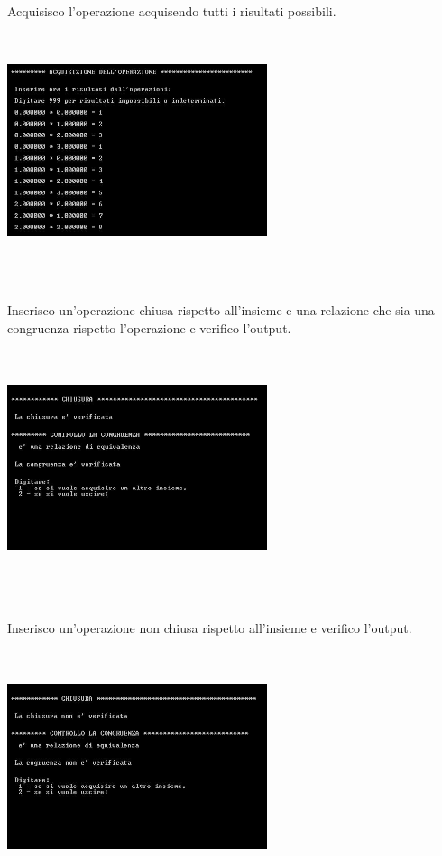 ﻿\documentclass[11pt,a4paper,titlepage,block]{article}
\begin{document}
\\
Acquisisco l'operazione acquisendo tutti i risultati possibili.\\
\includegraphics[width=3in,height=3in,viewport=0 0 300 300]{../Screenshots/Capture4.JPG}\\
\\
\newpage
Inserisco un'operazione chiusa rispetto all'insieme e una relazione che sia una congruenza rispetto l'operazione e verifico l'output.\\
\includegraphics[width=3in,height=3in,viewport=0 0 300 300]{../Screenshots/Capture7.JPG}\\
\\
Inserisco un'operazione non chiusa rispetto all'insieme e verifico l'output.\\
\includegraphics[width=3in,height=3in,viewport=0 0 300 300]{../Screenshots/Capture8.JPG}\\
\end{document}
